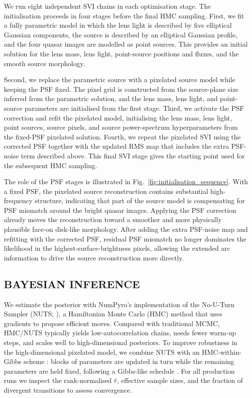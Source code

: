 \documentclass[fleqn,usenatbib]{mnras}
\begin{document}
We run eight independent SVI chains in each optimisation stage. The initialisation proceeds in four stages before the final HMC sampling. First, we fit a fully parametric model in which the lens light is described by five elliptical Gaussian components, the source is described by an elliptical Gaussian profile, and the four quasar images are modelled as point sources. This provides an initial solution for the lens mass, lens light, point-source positions and fluxes, and the smooth source morphology.

Second, we replace the parametric source with a pixelated source model while keeping the PSF fixed. The pixel grid is constructed from the source-plane size inferred from the parametric solution, and the lens mass, lens light, and point-source parameters are initialised from the first stage. Third, we activate the PSF correction and refit the pixelated model, initialising the lens mass, lens light, point sources, source pixels, and source power-spectrum hyperparameters from the fixed-PSF pixelated solution. Fourth, we repeat the pixelated SVI using the corrected PSF together with the updated RMS map that includes the extra PSF-noise term described above. This final SVI stage gives the starting point used for the subsequent HMC sampling.

The role of the PSF stages is illustrated in Fig.~\ref{fig:initialisation_sequence}. With a fixed PSF, the pixelated source reconstruction contains substantial high-frequency structure, indicating that part of the source model is compensating for PSF mismatch around the bright quasar images. Applying the PSF correction already moves the reconstruction toward a smoother and more physically plausible face-on disk-like morphology. After adding the extra PSF-noise map and refitting with the corrected PSF, residual PSF mismatch no longer dominates the likelihood in the highest-surface-brightness pixels, allowing the extended arc information to drive the source reconstruction more directly.

\subsection{BAYESIAN INFERENCE}

We estimate the posterior with NumPyro's implementation of the No-U-Turn Sampler (NUTS; \citealp{HoffmanGelman2014NUTS,Phan2019NumPyro}), a Hamiltonian Monte Carlo (HMC) method \citep{1987PhLB..195..216D,brooks2011handbook} that uses gradients to propose efficient moves. Compared with traditional MCMC, HMC/NUTS typically yields low-autocorrelation chains, needs fewer warm-up steps, and scales well to high-dimensional posteriors. To improve robustness in the high-dimensional pixelated model, we combine NUTS with an HMC-within-Gibbs scheme \citep{Krawczyk2024MultiHMCGibbs}: blocks of parameters are updated in turn while the remaining parameters are held fixed, following a Gibbs-like schedule \citep[cf.][]{GelmanBDA3}. For all production runs we inspect the rank-normalised \(\hat r\), effective sample sizes, and the fraction of divergent transitions to assess convergence.
\end{document}
